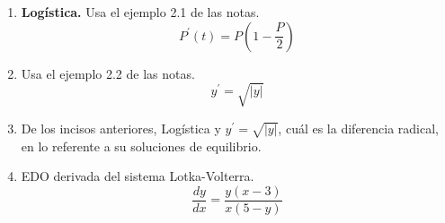 \begin{enumerate}[label=\arabic*., leftmargin=*, start=4]
    \item \textbf{Logística.} Usa el ejemplo 2.1 de las notas.
    \[ P^{\prime}(t)=P\left(1-\frac{P}{2}\right) \]
    
    \item Usa el ejemplo 2.2 de las notas.
    \[ y^{\prime}=\sqrt{|y|} \]
    
    \item De los incisos anteriores, Logística y $y^{\prime}=\sqrt{|y|}$, cuál es la diferencia radical, en lo referente a su soluciones de equilibrio.
    
    \item EDO derivada del sistema Lotka-Volterra.
    \begin{equation*}
        \frac{dy}{dx}=\frac{y(x-3)}{x(5-y)} \tag{5}
    \end{equation*}
\end{enumerate}